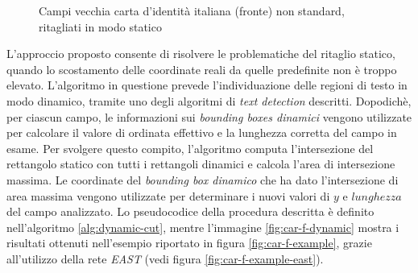 \begin{figure}[h]
	\centering
	\caption{Campi vecchia carta d'identit\`a italiana (fronte) non standard, ritagliati in modo statico} \label{fig:car-f-static}
\end{figure}
L'approccio proposto consente di risolvere le problematiche del ritaglio statico, quando lo scostamento delle coordinate reali da quelle predefinite non \`e troppo elevato. L'algoritmo in questione prevede l'individuazione delle regioni di testo in modo dinamico, tramite uno degli algoritmi di \textit{text detection} descritti. Dopodich\`e, per ciascun campo, le informazioni sui \textit{bounding boxes dinamici} vengono utilizzate per calcolare il valore di ordinata effettivo e la lunghezza corretta del campo in esame. Per svolgere questo compito, l'algoritmo computa l'intersezione del rettangolo statico con tutti i rettangoli dinamici e calcola l'area di intersezione massima. Le coordinate del \textit{bounding box dinamico} che ha dato l'intersezione di area massima vengono utilizzate per determinare i nuovi valori di $y$ e $lunghezza$ del campo analizzato. Lo pseudocodice della procedura descritta \`e definito nell'algoritmo \ref{alg:dynamic-cut}, mentre l'immagine \ref{fig:car-f-dynamic} mostra i risultati ottenuti nell'esempio riportato in figura \ref{fig:car-f-example}, grazie all'utilizzo della rete \textit{EAST} (vedi figura \ref{fig:car-f-example-east}).
